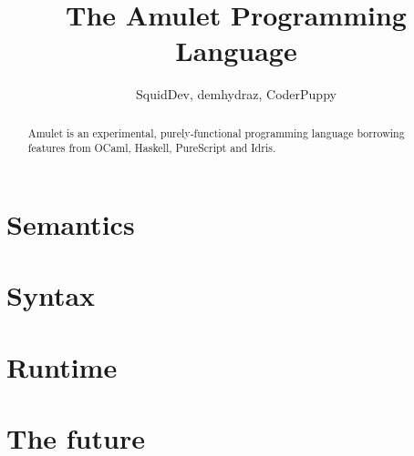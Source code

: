 \documentclass[notitlepage]{report}
\title{The Amulet Programming Language}
\author{SquidDev, demhydraz, CoderPuppy}
\begin{document}
\maketitle

\begin{abstract}
Amulet is an experimental, purely-functional programming language borrowing features from OCaml, Haskell, PureScript and Idris.
\end{abstract}

\tableofcontents

\chapter{Semantics}





\chapter{Syntax}






\chapter{Runtime}




\chapter{The future}


\printbibliography
\end{document}
